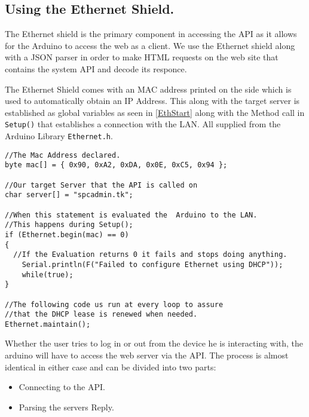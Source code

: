 \subsection{Using the Ethernet Shield.}
The Ethernet shield is the primary component in accessing the API as it allows for the Arduino to access the web as a client.
We use the Ethernet shield along with a JSON parser in order to make HTML requests on the web site that contains the system API and decode its responce.

The Ethernet Shield comes with an MAC address printed on the side which is used to automatically obtain an IP Address.
This along with the target server is established as global variables as seen in \autoref{EthStart} along with the Method call in \verb|Setup()| that establishes a connection with the LAN. All supplied from the Arduino Library \verb|Ethernet.h|.
\begin{lstlisting}[frame=single, label=EthStart, caption=The Method Calls used to establish and maintain a connection.]
//The Mac Address declared.
byte mac[] = { 0x90, 0xA2, 0xDA, 0x0E, 0xC5, 0x94 };

//Our target Server that the API is called on
char server[] = "spcadmin.tk";

//When this statement is evaluated the  Arduino to the LAN.
//This happens during Setup();
if (Ethernet.begin(mac) == 0) 
{
  //If the Evaluation returns 0 it fails and stops doing anything.
	Serial.println(F("Failed to configure Ethernet using DHCP"));
	while(true); 
}

//The following code us run at every loop to assure
//that the DHCP lease is renewed when needed.
Ethernet.maintain();
\end{lstlisting}

Whether the user tries to log in or out from the device he is interacting with, the arduino will have to access the web server via the API.
The process is almost identical in either case and can be divided into two parts:
\begin{itemize}
	\item Connecting to the API.
	\item Parsing the servers Reply.
\end{itemize}

